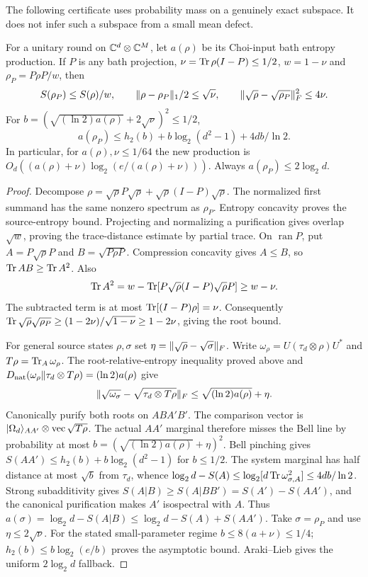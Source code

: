 The following certificate uses probability mass on a genuinely exact
subspace. It does not infer such a subspace from a small mean defect.

\begin{lemma}\label{lem:coherent-restriction}
For a unitary round on $\mathbb C^d\otimes\mathbb C^M$, let $a(\rho)$ be its
Choi-input bath entropy production. If $P$ is any bath projection,
$\nu=\operatorname{Tr}\rho(I-P)\leq1/2$, $w=1-\nu$ and
$\rho_P=P\rho P/w$, then
\[
 S(\rho_P)\leq S(\rho)/w,\qquad
 \lVert \rho-\rho_P\rVert_1/2\leq\sqrt\nu,\qquad
 \lVert \sqrt\rho-\sqrt{\rho_P}\rVert_F^2\leq4\nu.
\]
For $b=(\sqrt{(\ln2)a(\rho)}+2\sqrt\nu)^2\leq1/2$,
\begin{equation}\label{eq:coherent-projection-gain}
 a(\rho_P)\leq h_2(b)+b\log_2(d^2-1)+4db/\ln2.
\end{equation}
In particular, for $a(\rho),\nu\leq1/64$ the new production is
$O_d((a(\rho)+\nu)\log_2(e/(a(\rho)+\nu)))$.
Always $a(\rho_P)\leq2\log_2d$.
\end{lemma}

\begin{proof}
Decompose $\rho=\sqrt\rho P\sqrt\rho+
\sqrt\rho(I-P)\sqrt\rho$. The normalized first summand has the
same nonzero spectrum as $\rho_P$. Entropy concavity proves the
source-entropy bound. Projecting and normalizing a purification gives
overlap $\sqrt w$, proving the trace-distance estimate by partial trace.
On $\operatorname{ran}P$, put $A=P\sqrt\rho P$ and
$B=\sqrt{P\rho P}$. Compression concavity gives $A\leq B$, so
$\operatorname{Tr} AB\geq\operatorname{Tr} A^2$. Also
\[
 \operatorname{Tr} A^2=w-\operatorname{Tr}[P\sqrt\rho(I-P)\sqrt\rho P]\geq w-\nu.
\]
The subtracted term is at most $\operatorname{Tr}[(I-P)\rho]=\nu$.
Consequently $\operatorname{Tr}\sqrt\rho\sqrt{\rho_P}\geq
(1-2\nu)/\sqrt{1-\nu}\geq1-2\nu$, giving the root bound.

For general source states $\rho,\sigma$ set
$\eta=\lVert \sqrt\rho-\sqrt\sigma\rVert_F$. Write
$\omega_\rho=U(\tau_d\otimes\rho)U^*$ and
$T\rho=\operatorname{Tr}_A\omega_\rho$. The root-relative-entropy inequality
proved above and
$D_{\rm nat}(\omega_\rho\Vert\tau_d\otimes T\rho)=(\ln2)a(\rho)$
give
\[
 \lVert \sqrt{\omega_\sigma}-\sqrt{\tau_d\otimes T\rho}\rVert_F
 \leq\sqrt{(\ln2)a(\rho)}+\eta.
\]
Canonically purify both roots on $ABA'B'$. The comparison vector is
$\lvert \Omega_d\rangle_{AA'}\otimes\operatorname{vec}\sqrt{T\rho}$.
The actual $AA'$ marginal therefore misses the Bell line by probability
at most $b=(\sqrt{(\ln2)a(\rho)}+\eta)^2$.
Bell pinching gives $S(AA')\leq h_2(b)+b\log_2(d^2-1)$ for
$b\leq1/2$. The system marginal has half distance at most $\sqrt b$
from $\tau_d$, whence
$\log_2d-S(A)\leq\log_2[d\operatorname{Tr}\omega_{\sigma,A}^2]
\leq4db/\ln2$. Strong subadditivity gives
$S(A|B)\geq S(A|BB')=S(A')-S(AA')$, and the canonical
purification makes $A'$ isospectral with $A$. Thus
$a(\sigma)=\log_2d-S(A|B)\leq\log_2d-S(A)+S(AA')$.
Take $\sigma=\rho_P$ and use $\eta\leq2\sqrt\nu$.
For the stated small-parameter regime $b\leq8(a+\nu)\leq1/4$;
$h_2(b)\leq b\log_2(e/b)$ proves the asymptotic bound.
Araki--Lieb gives the uniform $2\log_2d$ fallback.
\end{proof}

